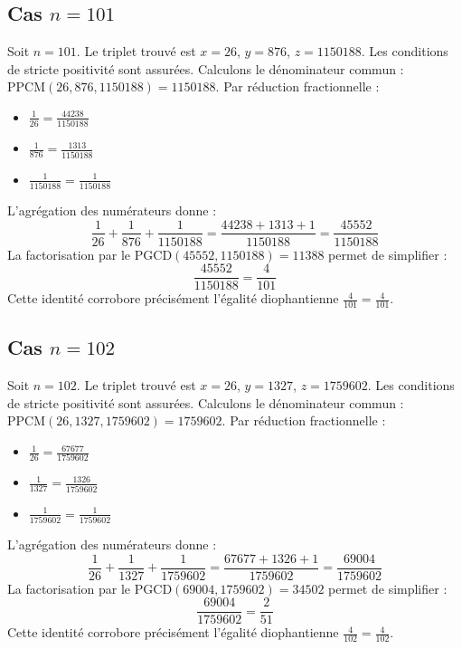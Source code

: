 \documentclass[11pt,a4paper]{article}
\begin{document}
\subsection{Cas $n = 101$}
Soit $n = 101$. Le triplet trouvé est $x = 26$, $y = 876$, $z = 1150188$.
Les conditions de stricte positivité sont assurées.
Calculons le dénominateur commun : $\text{PPCM}(26, 876, 1150188) = 1150188$.
Par réduction fractionnelle :
\begin{itemize}
    \item $\frac{1}{26} = \frac{44238}{1150188}$
    \item $\frac{1}{876} = \frac{1313}{1150188}$
    \item $\frac{1}{1150188} = \frac{1}{1150188}$
\end{itemize}
L'agrégation des numérateurs donne :
$$ \frac{1}{26} + \frac{1}{876} + \frac{1}{1150188} = \frac{44238 + 1313 + 1}{1150188} = \frac{45552}{1150188} $$
La factorisation par le $\text{PGCD}(45552, 1150188) = 11388$ permet de simplifier :
$$ \frac{45552}{1150188} = \frac{4}{101} $$
Cette identité corrobore précisément l'égalité diophantienne $\frac{4}{101} = \frac{4}{101}$.

\subsection{Cas $n = 102$}
Soit $n = 102$. Le triplet trouvé est $x = 26$, $y = 1327$, $z = 1759602$.
Les conditions de stricte positivité sont assurées.
Calculons le dénominateur commun : $\text{PPCM}(26, 1327, 1759602) = 1759602$.
Par réduction fractionnelle :
\begin{itemize}
    \item $\frac{1}{26} = \frac{67677}{1759602}$
    \item $\frac{1}{1327} = \frac{1326}{1759602}$
    \item $\frac{1}{1759602} = \frac{1}{1759602}$
\end{itemize}
L'agrégation des numérateurs donne :
$$ \frac{1}{26} + \frac{1}{1327} + \frac{1}{1759602} = \frac{67677 + 1326 + 1}{1759602} = \frac{69004}{1759602} $$
La factorisation par le $\text{PGCD}(69004, 1759602) = 34502$ permet de simplifier :
$$ \frac{69004}{1759602} = \frac{2}{51} $$
Cette identité corrobore précisément l'égalité diophantienne $\frac{4}{102} = \frac{4}{102}$.
\end{document}
